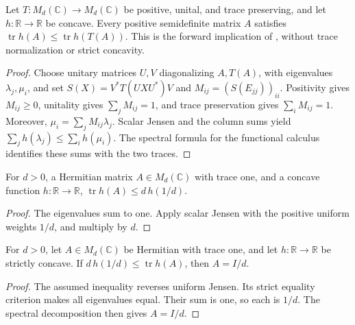 \begin{theorem}
    \label{thm:concave_trace_positive_map}
    \leanok
    Let $T:M_d(\mathbb C)\to M_d(\mathbb C)$ be positive, unital, and
    trace preserving, and let $h:\mathbb R\to\mathbb R$ be concave.
    Every positive semidefinite matrix $A$ satisfies
    $\operatorname{tr}h(A)\le\operatorname{tr}h(T(A))$.
    This is the forward implication of \cite[Equation~(8.22)]{Wolf2012Quantum},
    without trace normalization or strict concavity.
\end{theorem}
\begin{proof}\leanok
    Choose unitary matrices $U,V$ diagonalizing $A,T(A)$, with eigenvalues
    $\lambda_j,\mu_i$, and set
    $S(X)=V^*T(UXU^*)V$ and $M_{ij}=(S(E_{jj}))_{ii}$.
    Positivity gives $M_{ij}\ge0$, unitality gives $\sum_jM_{ij}=1$,
    and trace preservation gives $\sum_iM_{ij}=1$.
    Moreover, $\mu_i=\sum_jM_{ij}\lambda_j$.
    Scalar Jensen and the column sums yield
    $\sum_jh(\lambda_j)\le\sum_ih(\mu_i)$.
    The spectral formula for the functional calculus identifies these sums
    with the two traces.
\end{proof}

\begin{theorem}
    \label{thm:concave_trace_uniform}
    \leanok
    For $d>0$, a Hermitian matrix $A\in M_d(\mathbb C)$ with trace one,
    and a concave function $h:\mathbb R\to\mathbb R$,
    $\operatorname{tr}h(A)\le d\,h(1/d)$.
\end{theorem}
\begin{proof}\leanok
    The eigenvalues sum to one. Apply scalar Jensen with the positive
    uniform weights $1/d$, and multiply by $d$.
\end{proof}

\begin{theorem}
    \label{thm:strict_concave_trace_uniform}
    \leanok
    For $d>0$, let $A\in M_d(\mathbb C)$ be Hermitian with trace one,
    and let $h:\mathbb R\to\mathbb R$ be strictly concave.
    If $d\,h(1/d)\le\operatorname{tr}h(A)$, then $A=I/d$.
\end{theorem}
\begin{proof}\leanok
    The assumed inequality reverses uniform Jensen. Its strict equality
    criterion makes all eigenvalues equal. Their sum is one, so each is
    $1/d$. The spectral decomposition then gives $A=I/d$.
\end{proof}

